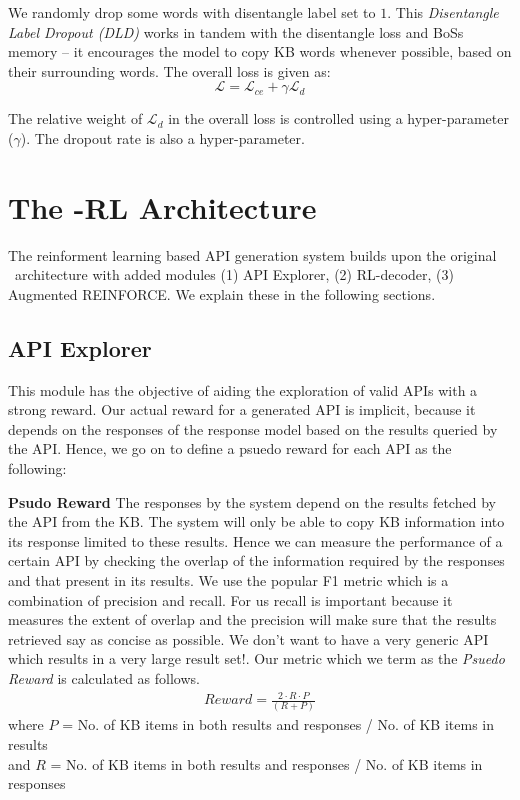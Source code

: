 We randomly drop some words with disentangle label set to $1$. This \textit{Disentangle Label Dropout (DLD)} works in tandem with the disentangle loss and {\sc BoSs} memory -- it encourages the model to copy KB words whenever possible, based on their surrounding words. The overall loss is given as:
\begin{equation}
\mathcal{L} = \mathcal{L}_{ce} + \gamma \mathcal{L}_{d}
\label{eqn:loss}
\end{equation}

The relative weight of $\mathcal{L}_{d}$ in the overall loss is controlled using a hyper-parameter ($\gamma$). The dropout rate is also a hyper-parameter.

\section{The \sys -RL Architecture}
The reinforment learning based API generation system builds upon the original \sys\ architecture with added modules (1) API Explorer, (2) RL-decoder, (3) Augmented REINFORCE. We explain these in the following sections.

\subsection{API Explorer}
This module has the objective of aiding the exploration of valid APIs with a strong reward. Our actual reward for a generated API is implicit, because it depends on the responses of the response model based on the results queried by the API. Hence, we go on to define a psuedo reward for each API as the following:

\noindent\textbf{Psudo Reward}
\label{ssec:PsReward}
The responses by the system depend on the results fetched by the API from the KB. The system will only be able to copy KB information into its response limited to these results. Hence we can measure the performance of a certain API by checking the overlap of the information required by the responses and that present in its results. We use the popular F1 metric which is a combination of precision and recall. For us recall is important because it measures the extent of overlap and the precision will make sure that the results retrieved say as concise as possible. We don't want to have a very generic API which results in a very large result set!. Our metric which we term as the {\em Psuedo Reward} is calculated as follows.
\begin{gather}
Reward = \frac{2 \cdot R \cdot P}{(R + P)}
\end{gather}
where $P$ = No. of KB items in both results and responses / No. of KB items in results \\ and $R$ = No. of KB items in both results and responses / No. of KB items in responses


